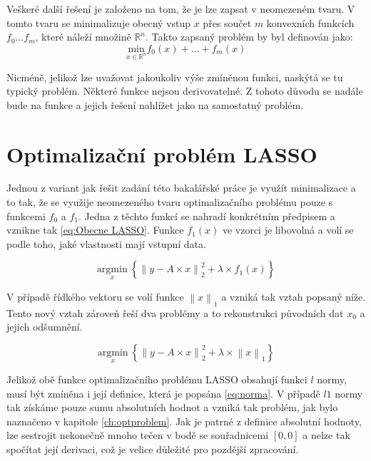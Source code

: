 \documentclass[FM,BP]{tulthesis}
\newcounter{Vzorce}
\begin{document}
Veškeré další řešení je založeno na tom, že je lze zapsat v neomezeném tvaru. V tomto tvaru se minimalizuje obecný vstup $x$ přes součet $m$ konvexních funkcích $f_0 \ldots f_m$, které náleží množině $\mathbb{R}^n$. Takto zapsaný problém by byl definován jako:
\begin{equation} \label{eq:Obecny problem} \tag{Vzorec \theVzorce}
\underset{x \in \mathbb{R}^n} {\mathrm{min}} f_{0}(x)+\ldots+f_{m}(x)
\end{equation}

Nicméně, jelikož lze uvažovat jakoukoliv výše zmíněnou funkci, naskýtá se tu typický problém. Některé funkce nejsou derivovatelné. Z tohoto důvodu se nadále bude na funkce a jejich řešení nahlížet jako na samostatný problém.

\section{Optimalizační problém LASSO}
Jednou z variant jak řešit zadání této bakalářské práce je využít minimalizace a to tak, že se využije neomezeného tvaru optimalizačního problému pouze s funkcemi $f_0$ a $f_1$. Jedna z těchto funkcí se nahradí konkrétním předpisem a vznikne tak \ref{eq:Obecne LASSO}. Funkce $f_1(x)$ ve vzorci je libovolná a volí se podle toho, jaké vlastnosti mají vstupní data. 

\begin{equation} \label{eq:Obecne LASSO} \tag{Vzorec \theVzorce}
\underset{x} {\mathrm{argmin}} ~\left\{\left\|y-A \times x\right\| ^2 _2+ \lambda \times f_1(x)\right\}
\end{equation}

V případě řídkého vektoru se volí funkce $\left\|x\right\|_1$ a vzniká tak vztah popsaný níže. Tento nový vztah zároveň řeší dva problémy a to rekonstrukci původních dat $x_0$ a jejich odšumnění.

\begin{equation} \label{eq:Konkretni LASSO} \tag{Vzorec \theVzorce}
\underset{x} {\mathrm{argmin}} ~\left\{\left\|y-A \times x\right\| ^2 _2+ \lambda \times \left\|x\right\|_1\right\}
\end{equation}

Jelikož obě funkce optimalizačního problému LASSO obsahují funkci $l$ normy, musí být zmíněna i její definice, která je popsána \ref{eq:norma}. V případě $l1$ normy tak získáme pouze sumu absolutních hodnot a vzniká tak problém, jak bylo naznačeno v kapitole \ref{ch:optproblem}. Jak je patrné z definice absolutní hodnoty, lze sestrojit nekonečně mnoho tečen v bodě se souřadnicemi $[0, 0]$ a nelze tak spočítat její derivaci, což je velice důležité pro pozdější zpracování.
\end{document}
